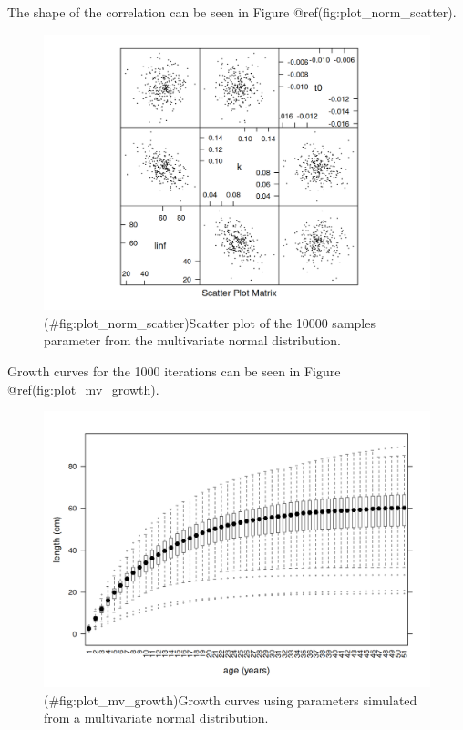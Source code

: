 \documentclass[
]{book}
\begin{document}
The shape of the correlation can be seen in Figure @ref(fig:plot\_norm\_scatter).

\begin{figure}
\centering
\includegraphics{_bookdown_files/_main_files/figure-html/plot_norm_scatter-1.png}
\caption{(\#fig:plot\_norm\_scatter)Scatter plot of the 10000 samples parameter from the multivariate normal distribution.}
\end{figure}

Growth curves for the 1000 iterations can be seen in Figure @ref(fig:plot\_mv\_growth).

\begin{figure}
\centering
\includegraphics{_bookdown_files/_main_files/figure-html/plot_mv_growth-1.png}
\caption{(\#fig:plot\_mv\_growth)Growth curves using parameters simulated from a multivariate normal distribution.}
\end{figure}
\end{document}
